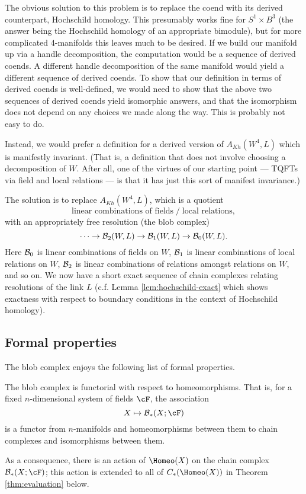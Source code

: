 The obvious solution to this problem is to replace the coend with its derived counterpart, 
Hochschild homology.
This presumably works fine for $S^1\times B^3$ (the answer being the Hochschild homology
of an appropriate bimodule), but for more complicated 4-manifolds this leaves much to be desired.
If we build our manifold up via a handle decomposition, the computation
would be a sequence of derived coends.
A different handle decomposition of the same manifold would yield a different
sequence of derived coends.
To show that our definition in terms of derived coends is well-defined, we
would need to show that the above two sequences of derived coends yield 
isomorphic answers, and that the isomorphism does not depend on any
choices we made along the way.
This is probably not easy to do.

Instead, we would prefer a definition for a derived version of $A_{Kh}(W^4, L)$
which is manifestly invariant.
(That is, a definition that does not
involve choosing a decomposition of $W$.
After all, one of the virtues of our starting point --- TQFTs via field and local relations ---
is that it has just this sort of manifest invariance.)

The solution is to replace $A_{Kh}(W^4, L)$, which is a quotient
\[
 \text{linear combinations of fields} \;\big/\; \text{local relations} ,
\]
with an appropriately free resolution (the blob complex)
\[
	\cdots\to {\mathcal B}_2(W, L) \to {\mathcal B}_1(W, L) \to {\mathcal B}_0(W, L) .
\]
Here ${\mathcal B}_0$ is linear combinations of fields on $W$,
${\mathcal B}_1$ is linear combinations of local relations on $W$,
${\mathcal B}_2$ is linear combinations of relations amongst relations on $W$,
and so on. We now have a short exact sequence of chain complexes relating resolutions of the link $L$ (c.f. Lemma \ref{lem:hochschild-exact} which shows exactness with respect to boundary conditions in the context of Hochschild homology).


\subsection{Formal properties}
\label{sec:properties}
The blob complex enjoys the following list of formal properties.

\begin{property}[Functoriality]
\label{property:functoriality}%
The blob complex is functorial with respect to homeomorphisms.
That is, 
for a fixed $n$-dimensional system of fields $\cF$, the association
\begin{equation*}
X \mapsto \bc_*(X; \cF)
\end{equation*}
is a functor from $n$-manifolds and homeomorphisms between them to chain 
complexes and isomorphisms between them.
\end{property}
As a consequence, there is an action of $\Homeo(X)$ on the chain complex $\bc_*(X; \cF)$; 
this action is extended to all of $C_*(\Homeo(X))$ in Theorem \ref{thm:evaluation} below.

